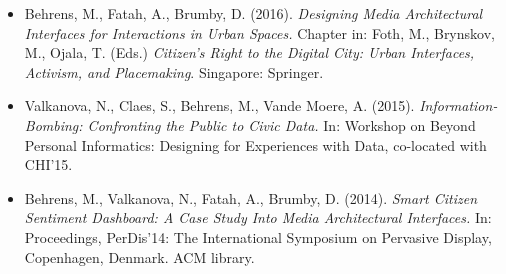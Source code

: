 \begin{acknowledgements}
\begin{singlespace}
{\begin{itemize}
\item Behrens, M., Fatah, A., Brumby, D. (2016). \textit{Designing Media Architectural Interfaces for Interactions in Urban Spaces.} Chapter in: Foth, M., Brynskov, M., Ojala, T. (Eds.) \textit{Citizen’s Right to the Digital City: Urban Interfaces, Activism, and Placemaking}. Singapore: Springer.

\item Valkanova, N., Claes, S., Behrens, M., Vande Moere, A. (2015). \textit{Information-Bombing: Confronting the Public to Civic Data.} In: Workshop on Beyond Personal Informatics: Designing for Experiences with Data, co-located with CHI’15.

\item Behrens, M., Valkanova, N., Fatah, A., Brumby, D. (2014). \textit{Smart Citizen Sentiment Dashboard: A Case Study Into Media Architectural Interfaces.} In: Proceedings, PerDis’14: The International Symposium on Pervasive Display, Copenhagen, Denmark. ACM library.


\end{itemize}}
\end{singlespace}
\end{acknowledgements}
